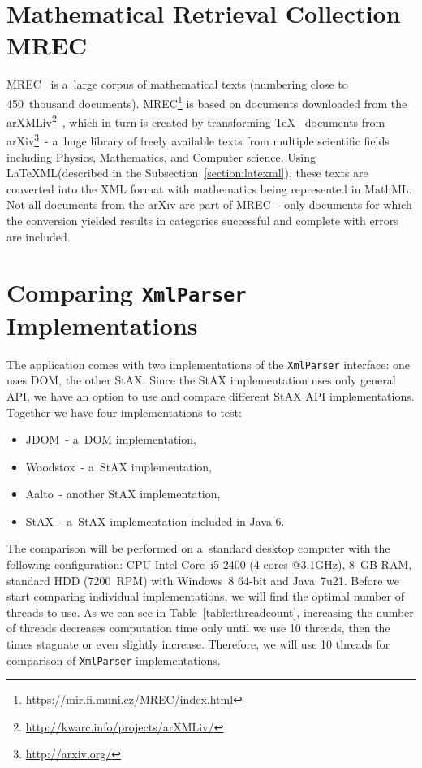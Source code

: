 \documentclass[11pt,oneside,final]{fithesis2}
\begin{document}
\section{Mathematical Retrieval Collection MREC}
\label{section:mrec}
MREC~\cite{mrec:mrec2011} is a~large corpus of mathematical texts (numbering close to 450~thousand documents). MREC\footnote{\url{https://mir.fi.muni.cz/MREC/index.html}} is based on documents downloaded from the arXMLiv\footnote{\url{http://kwarc.info/projects/arXMLiv/}}~\cite{mrec:arXMLiv2010}, which in turn is created by transforming \TeX~ documents from arXiv\footnote{\url{http://arxiv.org/}}~- a~huge library of freely available texts from multiple scientific fields including Physics, Mathematics, and Computer science. Using \LaTeX ML(described in the Subsection~\ref{section:latexml}), these texts are converted into the XML format with mathematics being represented in MathML. Not all documents from the arXiv are part of MREC~- only documents for which the conversion yielded results in categories successful and complete with errors are included.


\section{Comparing \texttt{XmlParser} Implementations}
\label{section:compareparsers}
The application comes with two implementations of the \texttt{XmlParser} interface: one uses DOM, the other StAX. Since the StAX implementation uses only general API, we have an option to use and compare different StAX API implementations. Together we have four implementations to test:
\begin{itemize}
\item JDOM~- a~DOM implementation,
\item Woodstox~- a~StAX implementation,
\item Aalto~- another StAX implementation,
\item StAX~- a~StAX implementation included in Java 6.
\end{itemize} 

The comparison will be performed on a~standard desktop computer with the following configuration: CPU Intel Core~i5-2400 (4 cores @3.1GHz), 8~GB RAM, standard HDD (7200~RPM) with Windows~8 64-bit and Java~7u21. Before we start comparing individual implementations, we will find the optimal number of threads to use. As we can see in Table~\ref{table:threadcount}, increasing the number of threads decreases computation time only until we use 10 threads, then the times stagnate or even slightly increase. Therefore, we will use 10 threads for comparison of \texttt{XmlParser} implementations.
\end{document}
